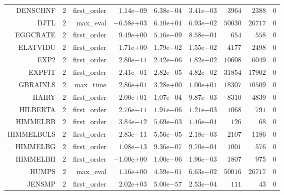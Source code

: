 \begin{longtable}{rrrrrrrrr}
DENSCHNF & \(     2\) & first\_order & \( 1.14\)e\(-09\) & \( 6.38\)e\(-04\) & \( 3.41\)e\(-03\) & \(  3964\) & \(  2388\) & \(     0\) \\
DJTL & \(     2\) & max\_eval & \(-6.58\)e\(+03\) & \( 6.10\)e\(+04\) & \( 6.93\)e\(-02\) & \( 50030\) & \( 26717\) & \(     0\) \\
EGGCRATE & \(     2\) & first\_order & \( 9.49\)e\(+00\) & \( 5.16\)e\(-09\) & \( 8.58\)e\(-04\) & \(   654\) & \(   558\) & \(     0\) \\
ELATVIDU & \(     2\) & first\_order & \( 1.71\)e\(+00\) & \( 1.79\)e\(-02\) & \( 1.55\)e\(-02\) & \(  4177\) & \(  2498\) & \(     0\) \\
EXP2 & \(     2\) & first\_order & \( 2.80\)e\(-11\) & \( 2.42\)e\(-06\) & \( 1.82\)e\(-02\) & \( 10608\) & \(  6049\) & \(     0\) \\
EXPFIT & \(     2\) & first\_order & \( 2.41\)e\(-01\) & \( 2.82\)e\(-05\) & \( 4.82\)e\(-02\) & \( 31854\) & \( 17902\) & \(     0\) \\
GBRAINLS & \(     2\) & max\_time & \( 2.86\)e\(+01\) & \( 3.28\)e\(+00\) & \( 1.00\)e\(+01\) & \( 18307\) & \( 10509\) & \(     0\) \\
HAIRY & \(     2\) & first\_order & \( 2.00\)e\(+01\) & \( 1.07\)e\(-04\) & \( 9.87\)e\(-03\) & \(  8310\) & \(  4839\) & \(     0\) \\
HILBERTA & \(     2\) & first\_order & \( 2.76\)e\(-11\) & \( 1.91\)e\(-06\) & \( 1.21\)e\(-03\) & \(  1068\) & \(   791\) & \(     0\) \\
HIMMELBB & \(     2\) & first\_order & \( 3.84\)e\(-12\) & \( 5.69\)e\(-03\) & \( 1.46\)e\(-04\) & \(   126\) & \(    68\) & \(     0\) \\
HIMMELBCLS & \(     2\) & first\_order & \( 2.83\)e\(-11\) & \( 5.56\)e\(-05\) & \( 2.18\)e\(-03\) & \(  2107\) & \(  1186\) & \(     0\) \\
HIMMELBG & \(     2\) & first\_order & \( 1.08\)e\(-13\) & \( 9.36\)e\(-07\) & \( 9.70\)e\(-04\) & \(  1001\) & \(   576\) & \(     0\) \\
HIMMELBH & \(     2\) & first\_order & \(-1.00\)e\(+00\) & \( 1.00\)e\(-06\) & \( 1.96\)e\(-03\) & \(  1807\) & \(   975\) & \(     0\) \\
HUMPS & \(     2\) & max\_eval & \( 1.16\)e\(+00\) & \( 4.59\)e\(-01\) & \( 6.63\)e\(-02\) & \( 50016\) & \( 26717\) & \(     0\) \\
JENSMP & \(     2\) & first\_order & \( 2.02\)e\(+03\) & \( 5.00\)e\(-57\) & \( 2.53\)e\(-04\) & \(   111\) & \(    43\) & \(     0\) \\

\end{longtable}
